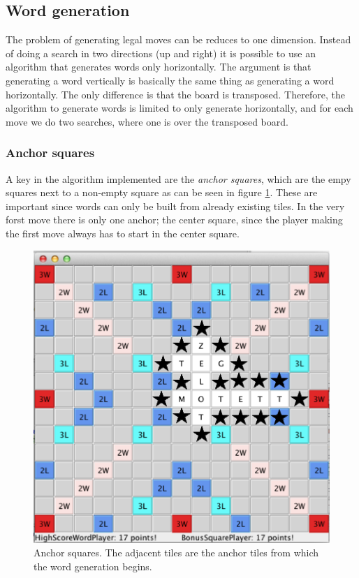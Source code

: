 \documentclass[a4paper, 12pt]{report}
\begin{document}
\subsection{Word generation}
The problem of generating legal moves can be reduces to one dimension. Instead of doing a search in two directions (up and right) it is possible to use an algorithm that generates words only horizontally. The argument is that generating a word vertically is basically the same thing as generating a word horizontally. The only difference is that the board is transposed. Therefore, the algorithm to generate words is limited to only generate horizontally, and for each move we do two searches, where one is over the transposed board.

\subsubsection{Anchor squares}
A key in the algorithm implemented are the \emph{anchor squares}, which are the empy squares next to a non-empty square as can be seen in figure \ref{fig:anchors}. These are important since words can only be built from already existing tiles. In the very forst move there is only one anchor; the center square, since the player making the first move always has to start in the center square.

\begin{figure}[h]
\centering
\includegraphics[scale=0.3]{anchors}
\caption{Anchor squares. The adjacent tiles are the anchor tiles from which the word generation begins.}
\label{fig:anchors}
\end{figure}
\end{document}
